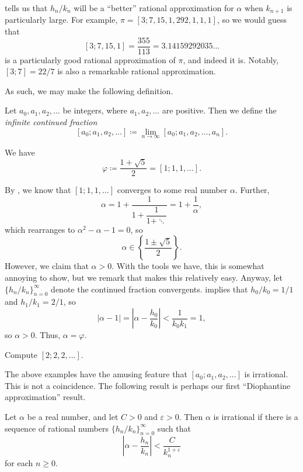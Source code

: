 \documentclass[../notes.tex]{subfiles}
\begin{document}
\begin{remark}
	 tells us that $h_n/k_n$ will be a ``better'' rational approximation for $\alpha$ when $k_{n+1}$ is particularly large. For example, $\pi=[3; 7, 15, 1, 292, 1,1,1]$, so we would guess that
	\[[3;7,15,1]=\frac{355}{113}=3.14159292035\ldots\]
	is a particularly good rational approximation of $\pi$, and indeed it is. Notably, $[3;7]=22/7$ is also a remarkable rational approximation.
\end{remark}
As such, we may make the following definition.
\begin{definition}
	Let $a_0,a_1,a_2,\ldots$ be integers, where $a_1,a_2,\ldots$ are positive. Then we define the \textit{infinite continued fraction}
	\[[a_0;a_1,a_2,\ldots]\coloneqq\lim_{n\to\infty}[a_0;a_1,a_2,\ldots,a_n].\]
\end{definition}
\begin{example} \label{ex:phi-contd-frac}
	We have
	\[\varphi\coloneqq\frac{1+\sqrt5}2=[1;1,1,\ldots].\]
\end{example}
\begin{solution}
	By , we know that $[1;1,1,\ldots]$ converges to some real number $\alpha$. Further,
	\[\alpha=1+\dfrac1{1+\dfrac1{1+\ddots}}=1+\frac1\alpha,\]
	which rearranges to $\alpha^2-\alpha-1=0$, so
	\[\alpha\in\left\{\frac{1\pm\sqrt5}2\right\}.\]
	However, we claim that $\alpha>0$. With the tools we have, this is somewhat annoying to show, but we remark that  makes this relatively easy. Anyway, let $\{h_n/k_n\}_{n=0}^\infty$ denote the continued fraction convergents.  implies that $h_0/k_0=1/1$ and $h_1/k_1=2/1$, so
	\[\left|\alpha-1\right|=\left|\alpha-\frac{h_0}{k_0}\right|<\frac1{k_0k_1}=1,\]
	so $\alpha>0$. Thus, $\alpha=\varphi$.
\end{solution}
\begin{exe} \label{exe:cf-twos}
	Compute $[2;2,2,\ldots]$.
\end{exe}
The above examples have the amusing feature that $[a_0;a_1,a_2,\ldots]$ is irrational. This is not a coincidence. The following result is perhaps our first ``Diophantine approximation'' result.
\begin{proposition} \label{prop:many-rats-is-irrat}
	Let $\alpha$ be a real number, and let $C>0$ and $\varepsilon>0$. Then $\alpha$ is irrational if there is a sequence of rational numbers $\{h_n/k_n\}_{n=0}^\infty$ such that
	\[\left|\alpha-\frac{h_n}{k_n}\right|<\frac C{k_n^{1+\varepsilon}}\]
	for each $n\ge0$.
\end{proposition}
\end{document}
